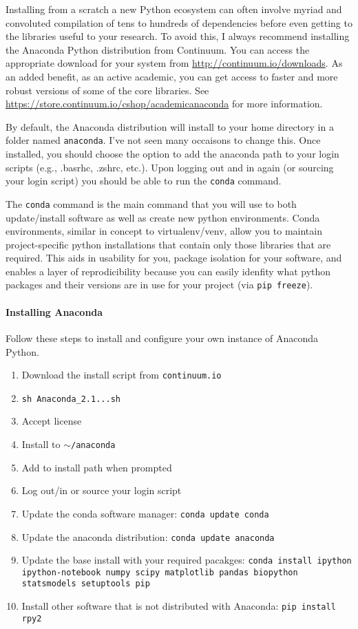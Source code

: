 \documentclass{article}
\begin{document}
Installing from a scratch a new Python ecosystem can often involve myriad and
convoluted compilation of tens to hundreds of dependencies before even getting
to the libraries useful to your research.  To avoid this, I always recommend
installing the Anaconda Python distribution from Continuum.  You can access
the appropriate download for your system from
\url{http://continuum.io/downloads}.  As an added benefit, as an active
academic, you can get access to faster and more robust versions of some of the
core libraries.  See \url{https://store.continuum.io/cshop/academicanaconda} for
more information.

By default, the Anaconda distribution will install to your home directory in a
folder named \texttt{anaconda}.  I've not seen many occaisons to change this.
Once installed, you should choose the option to add the anaconda path to your
login scripts (e.g., .basrhc, .zshrc, etc.).  Upon logging out and in again
(or sourcing your login script) you should be able to run the \texttt{conda} 
command.

The \texttt{conda} command is the main command that you will use to both 
update/install software as well as create new python environments.  Conda
environments, similar in concept to virtualenv/venv, allow you to maintain 
project-specific python installations that contain only those libraries that 
are required.  This aids in usability for you, package isolation for your
software, and enables a layer of reprodicibility because you can easily 
idenfity what python packages and their versions are in use for your project
(via \texttt{pip freeze}).

\paragraph{Installing Anaconda}

Follow these steps to install and configure your own instance of Anaconda
Python.

\begin{enumerate}
\item{Download the install script from \texttt{continuum.io}}
\item{\texttt{sh Anaconda\_2.1...sh}}
\item{Accept license}
\item{Install to \texttt{$\sim$/anaconda}}
\item{Add to install path when prompted}
\item{Log out/in or source your login script}
\item{Update the conda software manager: \texttt{conda update conda}}
\item{Update the anaconda distribution: \texttt{conda update anaconda}}
\item{Update the base install with your required pacakges: \texttt{conda
install ipython ipython-notebook numpy scipy matplotlib pandas biopython
statsmodels setuptools pip}}
\item{Install other software that is not distributed with Anaconda:
\texttt{pip install rpy2}}
\end{enumerate}
\end{document}
